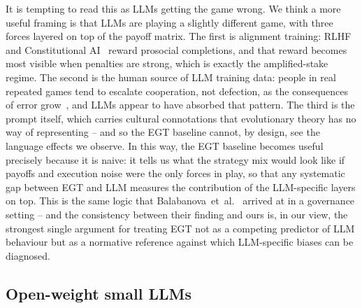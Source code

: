 \documentclass[a4paper,fleqn]{cas-sc}
\begin{document}
It is tempting to read this as LLMs getting the game wrong. We think a more useful framing is that LLMs are playing a slightly different game, with three forces layered on top of the payoff matrix. The first is alignment training: RLHF and Constitutional AI~\cite{ouyang2022training,anthropic2022constitutional} reward prosocial completions, and that reward becomes most visible when penalties are strong, which is exactly the amplified-stake regime. The second is the human source of LLM training data: people in real repeated games tend to escalate cooperation, not defection, as the consequences of error grow~\cite{krockow2016cooperation,list2006friend}, and LLMs appear to have absorbed that pattern. The third is the prompt itself, which carries cultural connotations that evolutionary theory has no way of representing -- and so the EGT baseline cannot, by design, see the language effects we observe. In this way, the EGT baseline becomes useful precisely because it is naive: it tells us what the strategy mix would look like if payoffs and execution noise were the only forces in play, so that any systematic gap between EGT and LLM measures the contribution of the LLM-specific layers on top. This is the same logic that Balabanova~et~al.~\cite{balabanova2025media} arrived at in a governance setting -- and the consistency between their finding and ours is, in our view, the strongest single argument for treating EGT not as a competing predictor of LLM behaviour but as a normative reference against which LLM-specific biases can be diagnosed.

\FloatBarrier

\subsection{Open-weight small LLMs}\label{sec:small_llm}
\end{document}
